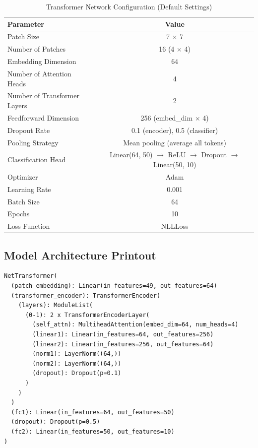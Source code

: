 \documentclass[11pt]{article}
\begin{document}
\begin{table}[H]
    \centering
    \caption{Transformer Network Configuration (Default Settings)}
    \vspace{0.1in}
    \begin{tabular}{lc}
        \toprule
        \textbf{Parameter} & \textbf{Value} \\
        \midrule
        Patch Size & 7 $\times$ 7 \\
        Number of Patches & 16 (4 $\times$ 4) \\
        Embedding Dimension & 64 \\
        Number of Attention Heads & 4 \\
        Number of Transformer Layers & 2 \\
        Feedforward Dimension & 256 (embed\_dim $\times$ 4) \\
        Dropout Rate & 0.1 (encoder), 0.5 (classifier) \\
        Pooling Strategy & Mean pooling (average all tokens) \\
        Classification Head & Linear(64, 50) $\rightarrow$ ReLU $\rightarrow$ Dropout $\rightarrow$ Linear(50, 10) \\
        \midrule
        Optimizer & Adam \\
        Learning Rate & 0.001 \\
        Batch Size & 64 \\
        Epochs & 10 \\
        Loss Function & NLLLoss \\
        \bottomrule
    \end{tabular}
\end{table}

\subsection{Model Architecture Printout}

\begin{verbatim}
NetTransformer(
  (patch_embedding): Linear(in_features=49, out_features=64)
  (transformer_encoder): TransformerEncoder(
    (layers): ModuleList(
      (0-1): 2 x TransformerEncoderLayer(
        (self_attn): MultiheadAttention(embed_dim=64, num_heads=4)
        (linear1): Linear(in_features=64, out_features=256)
        (linear2): Linear(in_features=256, out_features=64)
        (norm1): LayerNorm((64,))
        (norm2): LayerNorm((64,))
        (dropout): Dropout(p=0.1)
      )
    )
  )
  (fc1): Linear(in_features=64, out_features=50)
  (dropout): Dropout(p=0.5)
  (fc2): Linear(in_features=50, out_features=10)
)
\end{verbatim}
\end{document}
